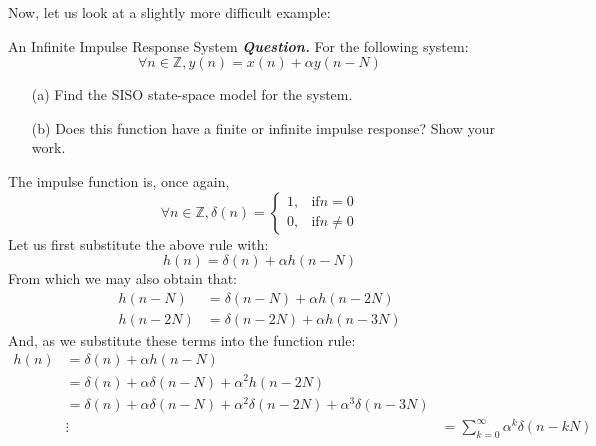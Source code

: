 Now, let us look at a slightly more difficult example:
\begin{ln-example}{An Infinite Impulse Response System}{}
    \textbf{\textit{Question.}} For the following system:
    \[
        \forall n \in \mathbb{Z}, y(n) = x(n) + \alpha y(n - N)
    \]
    \begin{enumerate}
        \item[(a)] Find the SISO state-space model for the system.
        \item[(b)] Does this function have a finite or infinite impulse response? Show your work.
    \end{enumerate}
    \tcblower
    The impulse function is, once again,
    \[
        \forall n \in \mathbb{Z}, \delta(n) = \begin{cases}
            1, &\text{if} n = 0 \\
            0, &\text{if} n \neq 0
        \end{cases}
    \]
    Let us first substitute the above rule with:
    \[
        h(n) = \delta(n) + \alpha h(n - N)
    \]
    From which we may also obtain that:
    \begin{align*}
        h(n - N) &= \delta(n - N) + \alpha h(n - 2N) \\
        h(n - 2N) &= \delta(n - 2N) + \alpha h(n - 3N)
    \end{align*}
    And, as we substitute these terms into the function rule:
    \begin{align*}
        h(n) &= \delta(n) + \alpha h(n - N) \\
        &= \delta(n) + \alpha \delta (n - N) + \alpha^2 h(n - 2N) \\
        &= \delta(n) + \alpha \delta (n - N) + \alpha^2 \delta(n - 2N) + \alpha^3 \delta(n - 3N) \\
        &\vdots
        &= \sum_{k = 0}^{\infty} \alpha^k \delta(n - kN)
    \end{align*}


\end{ln-example}

